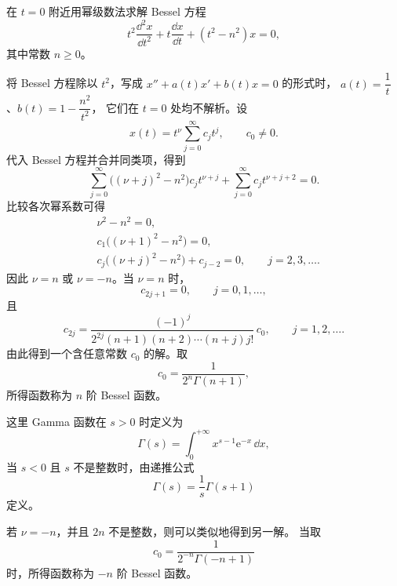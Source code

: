 \begin{example}\label{ex:Bessel方程的幂级数解}
	在 $t=0$ 附近用幂级数法求解 Bessel 方程
	\[
		t^2\dfrac{\dd^2x}{\dd t^2}
		+t\dfrac{\dd x}{\dd t}
		+(t^2-n^2)x=0,
	\]
	其中常数 $n\geq0$。

	\begin{solution}
		将 Bessel 方程除以 $t^2$，写成
		$x''+a(t)x'+b(t)x=0$ 的形式时，
		$a(t)=\dfrac{1}{t}$、$b(t)=1-\dfrac{n^2}{t^2}$，
		它们在 $t=0$ 处均不解析。设
		\[
			x(t)=t^{\nu}\sum_{j=0}^{\infty}c_jt^j,
			\qquad c_0\neq0.
		\]
		代入 Bessel 方程并合并同类项，得到
		\[
			\sum_{j=0}^{\infty}
			\bigl((\nu+j)^2-n^2\bigr)c_jt^{\nu+j}
			+\sum_{j=0}^{\infty}c_jt^{\nu+j+2}=0.
		\]
		比较各次幂系数可得
		\[
		\begin{aligned}
			&\nu^2-n^2=0,\\
			&c_1\bigl((\nu+1)^2-n^2\bigr)=0,\\
			&c_j\bigl((\nu+j)^2-n^2\bigr)+c_{j-2}=0,
			\qquad j=2,3,\ldots.
		\end{aligned}
		\]
		因此 $\nu=n$ 或 $\nu=-n$。当 $\nu=n$ 时，
		\[
			c_{2j+1}=0,
			\qquad j=0,1,\ldots,
		\]
		且
		\[
			c_{2j}
			=\dfrac{(-1)^j}
			{2^{2j}(n+1)(n+2)\cdots(n+j)j!}\,c_0,
			\qquad j=1,2,\ldots.
		\]
		由此得到一个含任意常数 $c_0$ 的解。取
		\[
			c_0=\dfrac{1}{2^n\Gamma(n+1)},
		\]
		所得函数称为 $n$ 阶 Bessel 函数。

		这里 Gamma 函数在 $s>0$ 时定义为
		\[
			\Gamma(s)=\int_{0}^{+\infty}x^{s-1}\mathrm{e}^{-x}\,\dd x,
		\]
		当 $s<0$ 且 $s$ 不是整数时，由递推公式
		\[
			\Gamma(s)=\dfrac{1}{s}\Gamma(s+1)
		\]
		定义。

		若 $\nu=-n$，并且 $2n$ 不是整数，则可以类似地得到另一解。
		当取
		\[
			c_0=\dfrac{1}{2^{-n}\Gamma(-n+1)}
		\]
		时，所得函数称为 $-n$ 阶 Bessel 函数。
	\end{solution}
\end{example}

